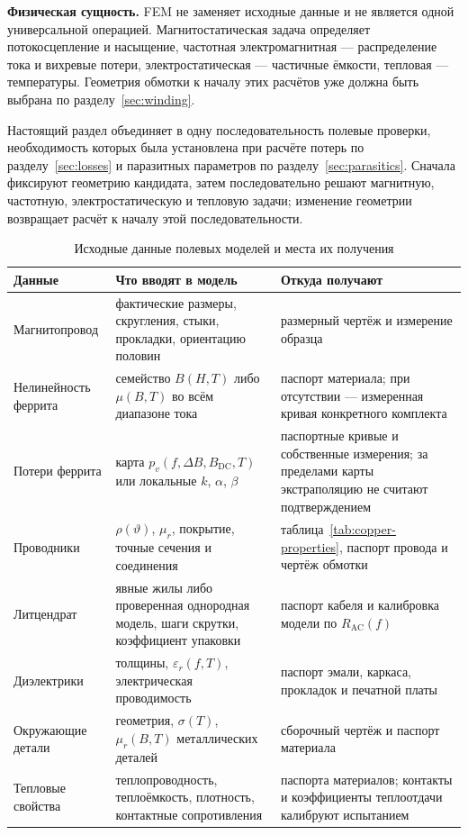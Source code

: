 \documentclass[14pt,a4paper]{extarticle}
\newcommand{\phys}{\par\noindent\textbf{Физическая сущность.} }
\begin{document}
\phys FEM не заменяет исходные данные и не является одной универсальной
операцией. Магнитостатическая задача определяет потокосцепление и насыщение,
частотная электромагнитная --- распределение тока и вихревые потери,
электростатическая --- частичные ёмкости, тепловая --- температуры. Геометрия
обмотки к началу этих расчётов уже должна быть выбрана по
разделу~\ref{sec:winding}.

Настоящий раздел объединяет в одну последовательность полевые проверки,
необходимость которых была установлена при расчёте потерь по
разделу~\ref{sec:losses} и паразитных параметров по
разделу~\ref{sec:parasitics}. Сначала фиксируют геометрию кандидата, затем
последовательно решают магнитную, частотную, электростатическую и тепловую
задачи; изменение геометрии возвращает расчёт к началу этой
последовательности.

\begin{table}[H]
\caption{Исходные данные полевых моделей и места их получения}
\label{tab:fem-input-sources}
\centering
\scriptsize
\begin{tabularx}{\textwidth}{>{\raggedright\arraybackslash}p{38mm}
>{\raggedright\arraybackslash}p{53mm} X}
\toprule
Данные & Что вводят в модель & Откуда получают \\
\midrule
Магнитопровод & фактические размеры, скругления, стыки, прокладки,
ориентацию половин & размерный чертёж и измерение образца \\
Нелинейность феррита & семейство $B(H,T)$ либо $\mu(B,T)$ во всём диапазоне
тока & паспорт материала; при отсутствии --- измеренная кривая конкретного
комплекта \\
Потери феррита & карта $p_v(f,\Delta B,B_{\text{DC}},T)$ или локальные
$k$, $\alpha$, $\beta$ & паспортные кривые и собственные измерения; за
пределами карты экстраполяцию не считают подтверждением \\
Проводники & $\rho(\vartheta)$, $\mu_r$, покрытие, точные сечения и
соединения & таблица~\ref{tab:copper-properties}, паспорт провода и чертёж
обмотки \\
Литцендрат & явные жилы либо проверенная однородная модель, шаги скрутки,
коэффициент упаковки & паспорт кабеля и калибровка модели по
$R_{\text{AC}}(f)$ \\
Диэлектрики & толщины, $\varepsilon_r(f,T)$, электрическая проводимость &
паспорт эмали, каркаса, прокладок и печатной платы \\
Окружающие детали & геометрия, $\sigma(T)$, $\mu_r(B,T)$ металлических
деталей & сборочный чертёж и паспорт материала \\
Тепловые свойства & теплопроводность, теплоёмкость, плотность, контактные
сопротивления & паспорта материалов; контакты и коэффициенты теплоотдачи
калибруют испытанием \\
\bottomrule
\end{tabularx}
\end{table}
\end{document}
